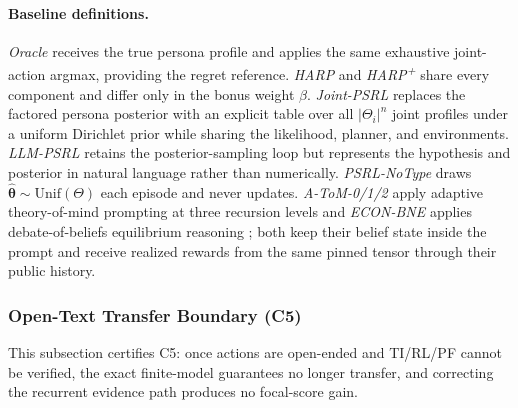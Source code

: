 \paragraph{Baseline definitions.}
\emph{Oracle} receives the true persona profile and applies the same exhaustive joint-action argmax, providing the regret reference. \emph{HARP} and \emph{HARP\textsuperscript{+}} share every component and differ only in the bonus weight $\beta$. \emph{Joint-PSRL} replaces the factored persona posterior with an explicit table over all $|\Theta_i|^n$ joint profiles under a uniform Dirichlet prior while sharing the likelihood, planner, and environments. \emph{LLM-PSRL} retains the posterior-sampling loop but represents the hypothesis and posterior in natural language rather than numerically. \emph{PSRL-NoType} draws $\hat{\boldsymbol\theta}\sim\mathrm{Unif}(\Theta)$ each episode and never updates. \emph{A-ToM-0/1/2} apply adaptive theory-of-mind prompting at three recursion levels \citep{mu2026adaptive} and \emph{ECON-BNE} applies debate-of-beliefs equilibrium reasoning \citep{yi2025debate}; both keep their belief state inside the prompt and receive realized rewards from the same pinned tensor through their public history.

\subsubsection{Open-Text Transfer Boundary (C5)}
\label{app:sotopia-detail}

This subsection certifies C5: once actions are open-ended and TI/RL/PF cannot be verified, the exact finite-model guarantees no longer transfer, and correcting the recurrent evidence path produces no focal-score gain.

